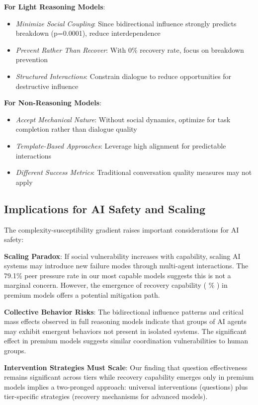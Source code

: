 \documentclass[11pt,letterpaper]{article}
\newcommand{\exponedataTotalSessionsRaw}{67}
\newcommand{\exponedataRecoverySessionsRaw}{9}
\newcommand{\exponedataRecoveryPercentage}{%
  \fpeval{round(\exponedataRecoverySessionsRaw / \exponedataTotalSessionsRaw * 100, 1)}\%
}
\newcommand{\exponedataPeerPressurePercentage}{79.1\%}
\newcommand{\exptwoBidirectionalPValue}{p=0.0001}
\begin{document}
\textbf{For Light Reasoning Models}:
\begin{itemize}
    \item \textit{Minimize Social Coupling}: Since bidirectional influence strongly predicts breakdown (\exptwoBidirectionalPValue{}), reduce interdependence
    \item \textit{Prevent Rather Than Recover}: With 0\% recovery rate, focus on breakdown prevention
    \item \textit{Structured Interactions}: Constrain dialogue to reduce opportunities for destructive influence
\end{itemize}

\textbf{For Non-Reasoning Models}:
\begin{itemize}
    \item \textit{Accept Mechanical Nature}: Without social dynamics, optimize for task completion rather than dialogue quality
    \item \textit{Template-Based Approaches}: Leverage high alignment for predictable interactions
    \item \textit{Different Success Metrics}: Traditional conversation quality measures may not apply
\end{itemize}

\subsection{Implications for AI Safety and Scaling}

The complexity-susceptibility gradient raises important considerations for AI safety:

\textbf{Scaling Paradox}: If social vulnerability increases with capability, scaling AI systems may introduce new failure modes through multi-agent interactions. The \exponedataPeerPressurePercentage{} peer pressure rate in our most capable models suggests this is not a marginal concern. However, the emergence of recovery capability (\exponedataRecoveryPercentage{}) in premium models offers a potential mitigation path.

\textbf{Collective Behavior Risks}: The bidirectional influence patterns and critical mass effects observed in full reasoning models indicate that groups of AI agents may exhibit emergent behaviors not present in isolated systems. The significant effect in premium models suggests similar coordination vulnerabilities to human groups.

\textbf{Intervention Strategies Must Scale}: Our finding that question effectiveness remains significant across tiers while recovery capability emerges only in premium models implies a two-pronged approach: universal interventions (questions) plus tier-specific strategies (recovery mechanisms for advanced models).
\end{document}
